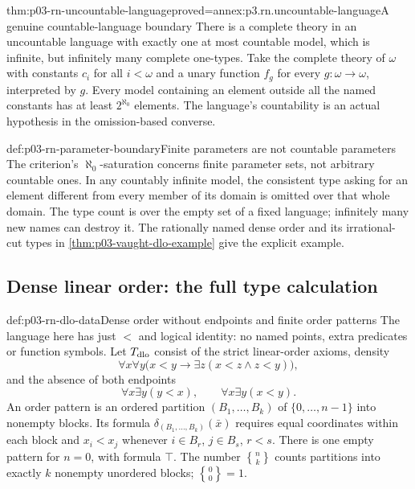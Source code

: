 \begin{hbtheorem}{thm:p03-rn-uncountable-language}{proved=annex:p3.rn.uncountable-language}{A genuine countable-language boundary}
There is a complete theory in an uncountable language with
exactly one at most countable model, which is infinite,
but infinitely many complete one-types.
Take the complete theory of \(\omega\) with constants \(c_i\)
for all \(i<\omega\) and a unary function \(f_g\) for every
\(g:\omega\to\omega\), interpreted by \(g\).
Every model containing an element outside all the named
constants has at least \(2^{\aleph_0}\) elements.
The language's countability is an actual hypothesis in
the omission-based converse.
\end{hbtheorem}

\begin{hbconvention}{def:p03-rn-parameter-boundary}{Finite parameters are not countable parameters}
The criterion's \(\aleph_0\)-saturation concerns finite
parameter sets, not arbitrary countable ones.
In any countably infinite model, the consistent type asking
for an element different from every member of its domain
is omitted over that whole domain.
The type count is over the empty set of a fixed language;
infinitely many new names can destroy it.
The rationally named dense order and its irrational-cut
types in \cref{thm:p03-vaught-dlo-example} give the explicit
example.
\end{hbconvention}

\subsection{Dense linear order: the full type calculation}
\label{sec:p03-rn-dlo}

\begin{hbdefinition}{def:p03-rn-dlo-data}{Dense order without endpoints and finite order patterns}
The language here has just \(<\) and logical identity:
no named points, extra predicates or function symbols.
Let \(T_{\rm dlo}\) consist of the strict linear-order axioms,
density
\[
 \forall x\forall y\bigl(x<y\to
                     \exists z(x<z\land z<y)\bigr),
\]
and the absence of both endpoints
\[
 \forall x\exists y(y<x),\qquad
 \forall x\exists y(x<y).
\]
An order pattern is an ordered partition \((B_1,\ldots,B_k)\)
of \(\{0,\ldots,n-1\}\) into nonempty blocks.
Its formula \(\delta_{(B_1,\ldots,B_k)}(\bar x)\)
requires equal coordinates within each block and
\(x_i<x_j\) whenever \(i\in B_r\), \(j\in B_s\), \(r<s\).
There is one empty pattern for \(n=0\), with formula \(\top\).
The number \({n\brace k}\) counts partitions into exactly
\(k\) nonempty unordered blocks; \({0\brace0}=1\).
\end{hbdefinition}

